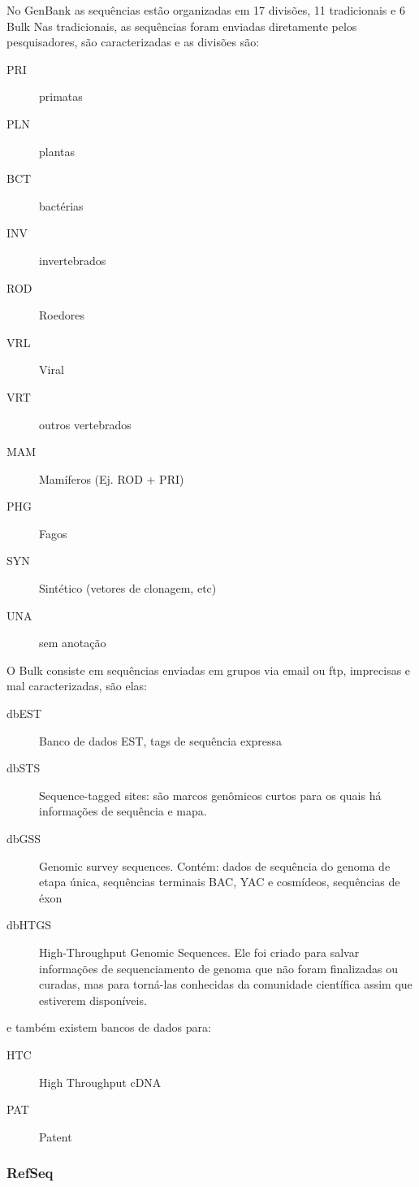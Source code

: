 \documentclass[letter,11pt]{book}
\begin{document}
No GenBank as sequências estão organizadas em 17 divisões, 11 tradicionais e 6 Bulk
Nas tradicionais, as sequências foram enviadas diretamente pelos pesquisadores, são caracterizadas e as divisões são:

\begin{description}
\item[PRI] primatas
\item[PLN] plantas
\item[BCT] bactérias
\item[INV] invertebrados
\item[ROD] Roedores
\item[VRL] Viral
\item[VRT] outros vertebrados
\item[MAM] Mamíferos (Ej. ROD + PRI)
\item[PHG] Fagos
\item[SYN] Sintético (vetores de clonagem, etc)
\item[UNA] sem anotação 
\end{description}


O Bulk consiste em sequências enviadas em grupos via email ou ftp, imprecisas e mal caracterizadas, são elas: 

\begin{description}
\item[dbEST] Banco de dados EST, tags de sequência expressa
\item[dbSTS] Sequence-tagged sites: são marcos genômicos curtos para os quais há informações de sequência e mapa. 
\item[dbGSS] Genomic survey sequences. Contém: dados de sequência do genoma de etapa única, sequências terminais BAC, YAC e cosmídeos, sequências de éxon
\item[dbHTGS] High-Throughput Genomic Sequences. Ele foi criado para salvar informações de sequenciamento de genoma que não foram finalizadas ou curadas, mas para torná-las conhecidas da comunidade científica assim que estiverem disponíveis.
\end{description}

e também existem bancos de dados para:

\begin{description}
\item[HTC] High Throughput cDNA
\item[PAT] Patent
\end{description}

\subsubsection{RefSeq}
\end{document}
